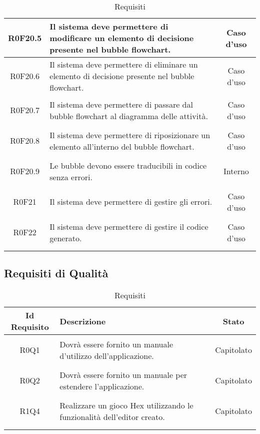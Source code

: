 \documentclass[../AnalisiDeiRequisiti.tex]{subfiles}
\begin{document}
\begin{longtable}{|c|>{\centering}p{7cm}|c|}
\hypertarget{R0F20.5}{R0F20.5} & Il sistema deve permettere di modificare un elemento di decisione presente nel bubble flowchart. & Caso d'uso \\ \hline
\hypertarget{R0F20.6}{R0F20.6} & Il sistema deve permettere di eliminare un elemento di decisione presente nel bubble flowchart. & Caso d'uso \\ \hline
\hypertarget{R0F20.7}{R0F20.7} & Il sistema deve permettere di passare dal bubble flowchart al diagramma delle attività. & Caso d'uso \\ \hline
\hypertarget{R0F20.8}{R0F20.8} & Il sistema deve permettere di riposizionare un elemento all'interno del bubble flowchart. & Caso d'uso \\ \hline
\hypertarget{R0F20.9}{R0F20.9} & Le bubble devono essere traducibili in codice senza errori. & Interno \\ \hline
\hypertarget{R0F21}{R0F21} & Il sistema deve permettere di gestire gli errori. & Caso d'uso \\ \hline
\hypertarget{R0F22}{R0F22} & Il sistema deve permettere di gestire il codice generato. & Caso d'uso \\ \hline
\caption[Requisiti]{Requisiti}
\label{tabella:req0}
\end{longtable}
\clearpage
\subsection{Requisiti di Qualità}
\normalsize
\begin{longtable}{|c|>{\centering}p{7cm}|c|}
	\hline
	\textbf{Id Requisito} & \textbf{Descrizione} & \textbf{Stato}\\
	\hline
	\endhead
	\hypertarget{R0Q1}{R0Q1} & Dovrà essere fornito un manuale d'utilizzo dell'applicazione. & Capitolato \\ \hline
	\hypertarget{R0Q2}{R0Q2} & Dovrà essere fornito un manuale per estendere l'applicazione. & Capitolato \\ \hline
	\hypertarget{R1Q4}{R1Q4} & Realizzare un gioco Hex utilizzando le funzionalità dell'editor creato. & Capitolato \\ \hline
	\caption[Requisiti]{Requisiti}
	\label{tabella:req1}
\end{longtable}
\clearpage
\end{document}
